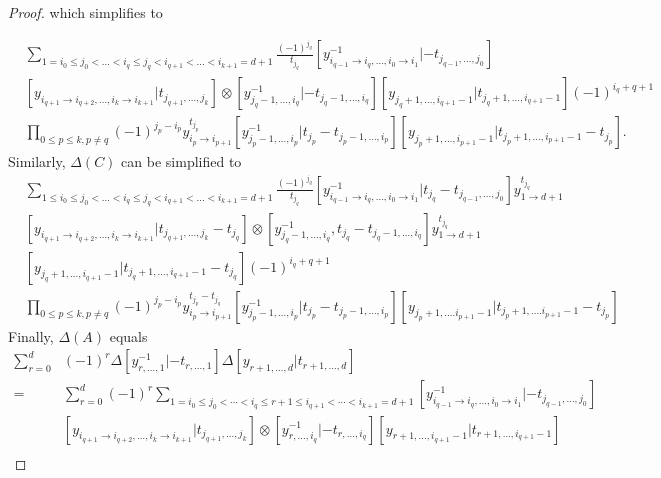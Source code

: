 \begin{proof}
which simplifies to

\begin{equation}
\begin{aligned}
&\sum_{1=i_0\leq j_0<\dots<i_q\leq j_q<i_{q+1}<\dots<i_{k+1}=d+1}\frac{(-1)^{j_q}}{t_{j_q}}[y_{i_{q-1}\to i_q,\dots,i_0\to i_1}^{-1}|-t_{j_{q-1},\dots,j_0}]\\
&[y_{i_{q+1}\to i_{q+2},\dots,i_k\to i_{k+1}}|t_{j_{q+1},\dots,j_k}]\otimes[y_{j_q-1,\dots,i_q}^{-1}|-t_{j_q-1,\dots,i_q}][y_{j_q+1,\dots,i_{q+1}-1}|t_{j_q+1,\dots,i_{q+1}-1}](-1)^{i_q+q+1}\\
&\prod_{0\leq p\leq k,p\neq q}(-1)^{j_p-i_p}y_{i_p\to i_{p+1}}^{t_{j_p}}[y_{j_p-1,\dots,i_p}^{-1}|t_{j_p}-t_{j_p-1,\dots,i_p}][y_{j_p+1,\dots,i_{p+1}-1}|t_{j_p+1,\dots,i_{p+1}-1}-t_{j_p}].
\end{aligned}
\end{equation}
Similarly, $\Delta(C)$ can be simplified to
\begin{equation}
\begin{aligned}
&\sum_{1\leq i_0\leq j_0<\dots<i_q\leq j_q<i_{q+1}<\dots<i_{k+1}=d+1}\frac{(-1)^{j_q}}{t_{j_q}}[y^{-1}_{i_{q-1}\to i_q,\dots,i_0\to i_1}|t_{j_q}-t_{j_{q-1},\dots,j_0}]y_{1\to d+1}^{t_{j_q}}\\
&[y_{i_{q+1}\to i_{q+2},\dots,i_k\to i_{k+1}}|t_{j_{q+1},\dots,j_k}-t_{j_q}]\otimes[y_{j_q-1,\dots,i_q}^{-1},t_{j_q}-t_{j_q-1,\dots,i_q}]y_{1\to d+1}^{t_{j_q}}\\
&[y_{j_q+1,\dots,i_{q+1}-1}|t_{j_q+1,\dots,i_{q+1}-1}-t_{j_q}](-1)^{i_q+q+1}\\
&\prod_{0\leq p\leq k,p\neq q}(-1)^{j_p-i_p}y_{i_p\to i_{p+1}}^{t_{j_p}-t_{j_q}}[y_{j_p-1,\dots,i_p}^{-1}|t_{j_p}-t_{j_p-1,\dots,i_p}][y_{j_p+1,\dots.i_{p+1}-1}|t_{j_p+1,\dots.i_{p+1}-1}-t_{j_p}]
\end{aligned}
\end{equation}
Finally, $\Delta(A)$ equals
\begin{equation}
\begin{aligned}
\sum_{r=0}^d&(-1)^r\Delta[y_{r,\dots,1}^{-1}|-t_{r,\dots,1}]\Delta[y_{r+1,\dots,d}|t_{r+1,\dots,d}]\\
=&\sum_{r=0}^d(-1)^r\sum_{1=i_0\leq j_0<\cdots<i_q\leq r+1\leq i_{q+1}<\cdots<i_{k+1}=d+1}[y_{i_{q-1}\to i_q,\dots,i_0\to i_1}^{-1}|-t_{j_{q-1},\dots,j_0}]\\
&[y_{i_{q+1}\to i_{q+2},\dots,i_k\to i_{k+1}}|t_{j_{q+1},\dots,j_k}]\otimes[y_{r,\dots,i_q}^{-1}|-t_{r,\dots,i_q}][y_{r+1,\dots,i_{q+1}-1}|t_{r+1,\dots,i_{q+1}-1}]\\

\end{aligned}
\end{equation}
\end{proof}
